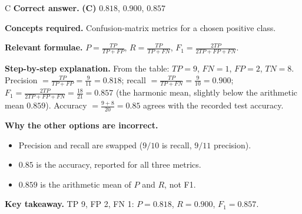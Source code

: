 \documentclass[11pt,a4paper]{article}
\newcommand{\qsep}{\par\vspace{2pt}{\color{black!15}\hrule}\vspace{4pt}}
\begin{document}
\begin{solbox}{C}
\textbf{\color{brand}Correct answer.} \textcolor{okgreen}{\textbf{(C)}} $0.818$, $0.900$, $0.857$

\textbf{\color{brand}Concepts required.} Confusion-matrix metrics for a chosen positive class.

\textbf{\color{brand}Relevant formulae.} $P = \frac{TP}{TP + FP}$, $R = \frac{TP}{TP + FN}$, $F_1 = \frac{2TP}{2TP + FP + FN}$.

\textbf{\color{brand}Step-by-step explanation.} From the table: $TP = 9$, $FN = 1$, $FP = 2$, $TN = 8$.
Precision $= \frac{TP}{TP + FP} = \frac{9}{11} = 0.818$; recall $= \frac{TP}{TP + FN} = \frac{9}{10} = 0.900$;
$F_1 = \frac{2TP}{2TP + FP + FN} = \frac{18}{21} = 0.857$ (the harmonic mean, slightly below the arithmetic mean $0.859$).
Accuracy $= \frac{9 + 8}{20} = 0.85$ agrees with the recorded test accuracy.

\textbf{\color{brand}Why the other options are incorrect.}
\begin{itemize}[leftmargin=2.4em, itemsep=1pt, topsep=2pt]
\item[\textbf{(A)}] Precision and recall are swapped ($9/10$ is recall, $9/11$ precision).
\item[\textbf{(B)}] $0.85$ is the accuracy, reported for all three metrics.
\item[\textbf{(D)}] $0.859$ is the arithmetic mean of $P$ and $R$, not F1.
\end{itemize}
\textbf{\color{brand}Key takeaway.} TP 9, FP 2, FN 1: $P = 0.818$, $R = 0.900$, $F_1 = 0.857$.
\end{solbox}
\qsep
\end{document}

